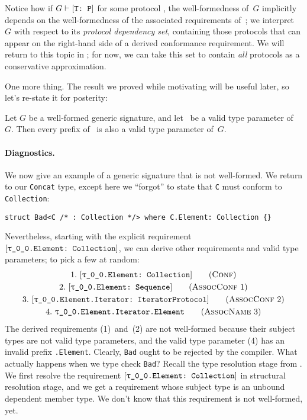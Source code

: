 \documentclass[../generics]{subfiles}
\begin{document}
Notice how if $G\vdash[\texttt{T:~P}]$ for some protocol \tP, the well-formedness of~$G$ implicitly depends on the well-formedness of the associated requirements of~\tP; we interpret~$G$ with respect to its \emph{protocol dependency set}, containing those protocols that can appear on the right-hand side of a derived conformance requirement. We will return to this topic in ; for now, we can take this set to contain \emph{all} protocols as a conservative approximation.

One more thing. The result we proved while motivating  will be useful later, so let's re-state it for posterity:
\begin{proposition}\label{prefix prop}
Let $G$ be a well-formed generic signature, and let \tT\ be a valid type parameter of~$G$. Then every prefix of \tT\ is also a valid type parameter of~$G$.
\end{proposition}

\paragraph{Diagnostics.} We now give an example of a generic signature that is not well-formed. We return to our \texttt{Concat} type, except here we ``forgot'' to state that \texttt{C} must conform to \texttt{Collection}:
\begin{Verbatim}
struct Bad<C /* : Collection */> where C.Element: Collection {}
\end{Verbatim}
Nevertheless, starting with the explicit requirement $\ConfReq{\rT.Element}{Collection}$, we can derive other requirements and valid type parameters; to pick a few at random:
\begin{gather*}
\ConfStep{\rT.Element}{Collection}{1}\\
\AssocConfStep{1}{\rT.Element}{Sequence}{2}\\
\AssocConfStep{2}{\rT.Element.Iterator}{IteratorProtocol}{3}\\
\AssocNameStep{3}{\rT.Element.Iterator.Element}{4}
\end{gather*}
The derived requirements (1)~and~(2) are not well-formed because their subject types are not valid type parameters, and the valid type parameter (4) has an invalid prefix \texttt{\rT.Element}. Clearly, \texttt{Bad} ought to be rejected by the compiler. What actually happens when we type check \texttt{Bad}? Recall the type resolution stage from . We first resolve the requirement $\ConfReq{\rT.Element}{Collection}$ in structural resolution stage, and we get a requirement whose subject type is an unbound dependent member type. We don't know that this requirement is not well-formed, yet.
\end{document}
